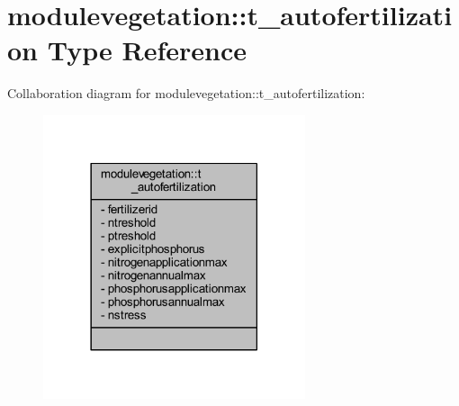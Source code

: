 \hypertarget{structmodulevegetation_1_1t__autofertilization}{}\section{modulevegetation\+:\+:t\+\_\+autofertilization Type Reference}
\label{structmodulevegetation_1_1t__autofertilization}


Collaboration diagram for modulevegetation\+:\+:t\+\_\+autofertilization\+:\nopagebreak
\begin{figure}[H]
\begin{center}
\leavevmode
\includegraphics[width=218pt]{structmodulevegetation_1_1t__autofertilization__coll__graph}
\end{center}
\end{figure}
